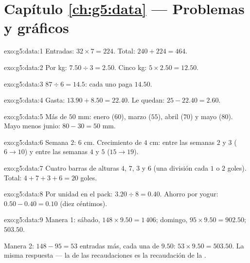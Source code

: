 \section*{Capítulo \ref{ch:g5:data} --- Problemas y gráficos}

\begin{solution}{exo:g5:data:1}
Entradas: $32 \times 7 = 224$. Total: $240 + 224 = 464$.
\end{solution}

\begin{solution}{exo:g5:data:2}
Por kg: $7.50 \div 3 = 2.50$. Cinco kg:
$5 \times 2.50 = 12.50$.
\end{solution}

\begin{solution}{exo:g5:data:3}
$87 \div 6 = 14.5$: cada uno paga $14.50$.
\end{solution}

\begin{solution}{exo:g5:data:4}
Gasta: $13.90 + 8.50 = 22.40$. Le quedan: $25 - 22.40 = 2.60$.
\end{solution}

\begin{solution}{exo:g5:data:5}
Más de $50$ mm: enero ($60$), marzo ($55$), abril ($70$) y mayo
($80$). Mayo menos junio: $80 - 30 = 50$ mm.
\end{solution}

\begin{solution}{exo:g5:data:6}
Semana $2$: $6$ cm. Crecimiento de $4$ cm: entre las semanas $2$ y $3$
($6 \to 10$) y entre las semanas $4$ y $5$ ($15 \to 19$).
\end{solution}

\begin{solution}{exo:g5:data:7}
Cuatro barras de alturas $4$, $7$, $3$ y $6$ (una división cada $1$ o
$2$ goles). Total: $4 + 7 + 3 + 6 = 20$ goles.
\end{solution}

\begin{solution}{exo:g5:data:8}
Por unidad en el pack: $3.20 \div 8 = 0.40$. Ahorro por yogur:
$0.50 - 0.40 = 0.10$ (diez céntimos).
\end{solution}

\begin{solution}{exo:g5:data:9}
Manera 1: sábado, $148 \times 9.50 = 1\,406$; domingo,
$95 \times 9.50 = 902.50$;  $503.50$.

Manera 2: $148 - 95 = 53$ entradas más, cada una de $9.50$:
$53 \times 9.50 = 503.50$. La misma respuesta --- la  de las
recaudaciones es la recaudación de la .
\end{solution}

